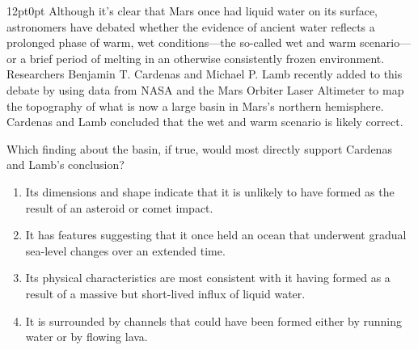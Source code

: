 \documentclass[11pt, twocolumn]{article}
\newcounter{questionnum}
\begin{document}
\vspace{6pt}\noindent
\begin{minipage}{\columnwidth}\raggedright
\noindent{}\par\vspace{8pt}
\begin{adjustwidth}{12pt}{0pt}
Although it's clear that Mars once had liquid water on its surface, astronomers have debated whether the evidence of ancient water reflects a prolonged phase of warm, wet conditions---the so-called wet and warm scenario---or a brief period of melting in an otherwise consistently frozen environment. Researchers Benjamin T. Cardenas and Michael P. Lamb recently added to this debate by using data from NASA and the Mars Orbiter Laser Altimeter to map the topography of what is now a large basin in Mars's northern hemisphere. Cardenas and Lamb concluded that the wet and warm scenario is likely correct.
\vspace{6pt}

Which finding about the basin, if true, would most directly support Cardenas and Lamb's conclusion?
\begin{enumerate}[label=\Alph*),leftmargin=18pt,topsep=3pt,itemsep=2pt]
  \item Its dimensions and shape indicate that it is unlikely to have formed as the result of an asteroid or comet impact.
  \item It has features suggesting that it once held an ocean that underwent gradual sea-level changes over an extended time.
  \item Its physical characteristics are most consistent with it having formed as a result of a massive but short-lived influx of liquid water.
  \item It is surrounded by channels that could have been formed either by running water or by flowing lava.
\end{enumerate}
\end{adjustwidth}
\end{minipage}\par
\end{document}
